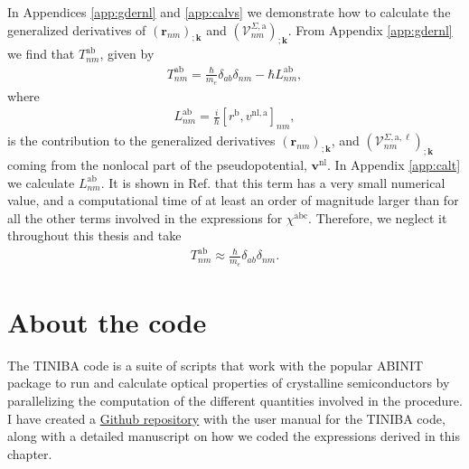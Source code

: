 In Appendices \ref{app:gdernl} and \ref{app:calvs} we demonstrate how to
calculate the generalized derivatives of
$\left(\mathbf{r}_{nm}\right)_{;\mathbf{k}}$ and
$\left(\mathcal{V}^{\Sigma,\mathrm{a}}_{nm}\right)_{;\mathbf{k}}$. From
Appendix \ref{app:gdernl} we find that
$T_{nm}^{\mathrm{ab}}$, given by
\begin{align}\label{tau.1}
T_{nm}^{\mathrm{ab}}
= \frac{\hbar}{m_{e}}\delta_{ab}\delta_{nm}
- \hbar L_{nm}^{\mathrm{ab}},
\end{align}  
where
\begin{align}\label{tau.2}
L_{nm}^{\mathrm{ab}}
= \frac{i}{\hbar}\left[r^{\mathrm{b}},v^{\mathrm{nl},\mathrm{a}}\right]_{nm},
\end{align}
is the contribution to the generalized derivatives
$\left(\mathbf{r}_{nm}\right)_{;\mathbf{k}}$, and
$\left(\mathcal{V}^{\Sigma,\mathrm{a},\ell}_{nm}\right)_{;\mathbf{k}}$ coming
from the nonlocal part of the pseudopotential, $\mathbf{v}^{\mathrm{nl}}$. In
Appendix \ref{app:calt} we calculate $L^{\mathrm{ab}}_{nm}$. It is shown in Ref.
\cite{valerie} that this term has a very small numerical value, and a
computational time of at least an order of magnitude larger than for all the
other terms involved in the expressions for $\chi^{\mathrm{abc}}$. Therefore, we
neglect it throughout this thesis and take
\begin{align}\label{tau.69}
T_{nm}^{\mathrm{ab}} \approx \frac{\hbar}{m_{e}}\delta_{ab}\delta_{nm}.
\end{align} 



\section{About the code}

The TINIBA code is a suite of scripts that work with the popular ABINIT package
to run and calculate optical properties of crystalline semiconductors by
parallelizing the computation of the different quantities involved in the
procedure. I have created a
\href{https://github.com/roguephysicist/tiniba-manual}{Github repository}
with the user manual for the TINIBA code, along with a detailed manuscript on
how we coded the expressions derived in this chapter.



